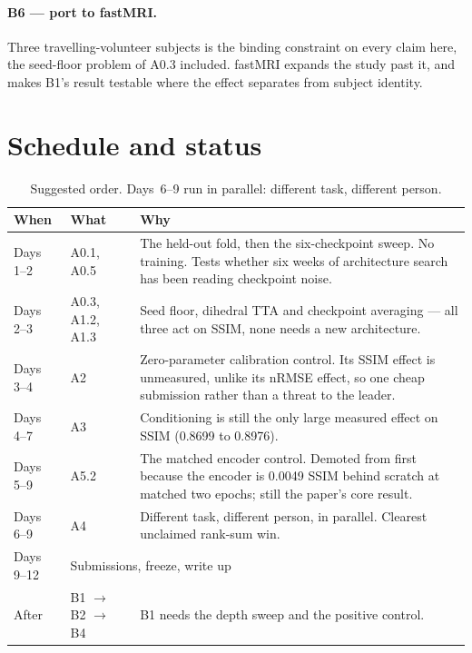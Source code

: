 \documentclass[11pt,a4paper]{article}
\newcommand{\rmse}{nRMSE}
\begin{document}
\paragraph{B6 --- port to fastMRI.} Three travelling-volunteer subjects is the binding constraint on
every claim here, the seed-floor problem of A0.3 included. fastMRI expands the study past it, and makes
B1's result testable where the effect separates from subject identity.

\section{Schedule and status}
\label{sec:schedule}

\begin{table}[H]
  \centering
  \small
  \caption{Suggested order. Days~6--9 run in parallel: different task, different person.}
  \label{tab:schedule}
  \begin{tabular}{llp{8.0cm}}
    \toprule
    When & What & Why \\
    \midrule
    Days 1--2 & A0.1, A0.5 & The held-out fold, then the six-checkpoint sweep. No training. Tests
      whether six weeks of architecture search has been reading checkpoint noise. \\[2pt]
    Days 2--3 & A0.3, A1.2, A1.3 & Seed floor, dihedral TTA and checkpoint averaging --- all three act on
      SSIM, none needs a new architecture. \\[2pt]
    Days 3--4 & A2 & Zero-parameter calibration control. Its SSIM effect is unmeasured, unlike its
      \rmse{} effect, so one cheap submission rather than a threat to the leader. \\[2pt]
    Days 4--7 & A3 & Conditioning is still the only large measured effect on SSIM
      (\num{0.8699} to \num{0.8976}). \\[2pt]
    Days 5--9 & A5.2 & The matched encoder control. Demoted from first because the encoder is
      \num{0.0049} SSIM behind scratch at matched two epochs; still the paper's core result. \\[2pt]
    Days 6--9 & A4 & Different task, different person, in parallel. Clearest unclaimed rank-sum win. \\[2pt]
    Days 9--12 & \multicolumn{2}{l}{Submissions, freeze, write up} \\
    \midrule
    After & B1 $\to$ B2 $\to$ B4 & B1 needs the depth sweep and the positive control. \\
    \bottomrule
  \end{tabular}
\end{table}
\end{document}
